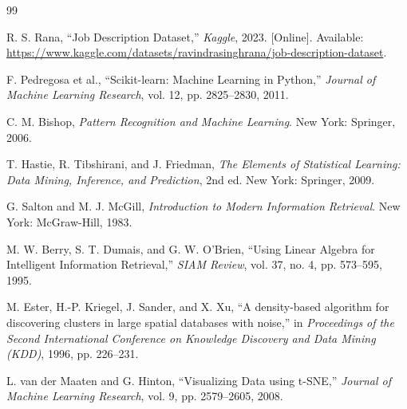 \documentclass[a4paper,12pt]{report}
\begin{document}
	\begin{thebibliography}{99}
		
		R. S. Rana, ``Job Description Dataset,'' \textit{Kaggle}, 2023. [Online]. Available: \url{https://www.kaggle.com/datasets/ravindrasinghrana/job-description-dataset}.
		
		F. Pedregosa et al., ``Scikit-learn: Machine Learning in Python,'' \textit{Journal of Machine Learning Research}, vol. 12, pp. 2825--2830, 2011.
		
		C. M. Bishop, \textit{Pattern Recognition and Machine Learning}. New York: Springer, 2006.
		
		T. Hastie, R. Tibshirani, and J. Friedman, \textit{The Elements of Statistical Learning: Data Mining, Inference, and Prediction}, 2nd ed. New York: Springer, 2009.
		
		G. Salton and M. J. McGill, \textit{Introduction to Modern Information Retrieval}. New York: McGraw-Hill, 1983.
		
		M. W. Berry, S. T. Dumais, and G. W. O'Brien, ``Using Linear Algebra for Intelligent Information Retrieval,'' \textit{SIAM Review}, vol. 37, no. 4, pp. 573--595, 1995.
		
		M. Ester, H.-P. Kriegel, J. Sander, and X. Xu, ``A density-based algorithm for discovering clusters in large spatial databases with noise,'' in \textit{Proceedings of the Second International Conference on Knowledge Discovery and Data Mining (KDD)}, 1996, pp. 226--231.
		
		L. van der Maaten and G. Hinton, ``Visualizing Data using t-SNE,'' \textit{Journal of Machine Learning Research}, vol. 9, pp. 2579--2605, 2008.
		
	\end{thebibliography}
	
\end{document}
